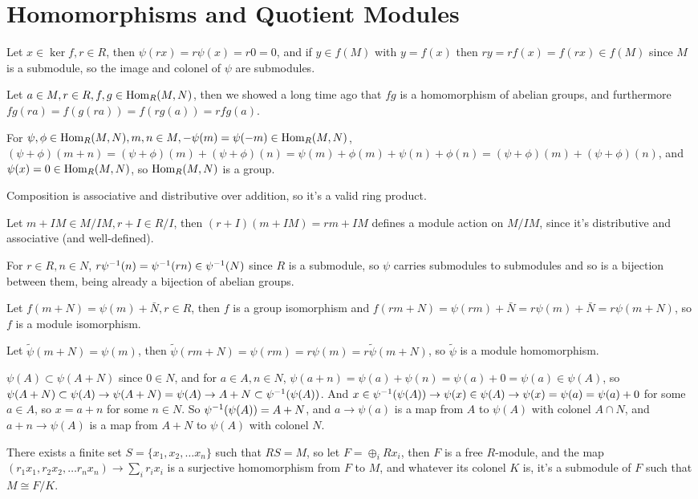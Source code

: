 \documentclass[11pt, oneside]{article}   	%
\begin{document}
\section{Homomorphisms and Quotient Modules}
\be
\item \be
\item Let $x \in \ker f, r \in R$, then $\psi(rx) = r\psi(x) = r0 = 0$, and if $y \in f(M)$ with $y = f(x)$ then $ry = rf(x) = f(rx) \in f(M)$ since $M$ is a submodule, so the image and colonel of $\psi$ are submodules.
\item Let $a \in M, r \in R, f, g \in \text{Hom}_R(M, N)$, then we showed a long time ago that $fg$ is a homomorphism of abelian groups, and furthermore $fg(ra) =f(g(ra)) = f(rg(a)) = rfg(a)$.
\ee
\item \be
\item For $\psi, \phi \in \text{Hom}_R(M, N), m, n \in M, -\psi(m) = \psi(-m) \in \text{Hom}_R(M, N)$, $(\psi + \phi)(m + n) = (\psi + \phi)(m) + (\psi + \phi)(n) = \psi(m) + \phi(m) + \psi(n) + \phi(n) = (\psi + \phi)(m) + (\psi + \phi)(n)$, and $\psi(x) = 0 \in \text{Hom}_R(M, N)$, so $\text{Hom}_R(M, N)$ is a group. 
\item Composition is associative and distributive over addition, so it's a valid ring product.
\ee
\item Let $m + IM \in M/IM, r + I \in R/I$, then $(r + I)(m + IM) = rm + IM$ defines a module action on $M/IM$, since it's distributive and associative (and well-defined). 
\item For $r \in R, n \in N$, $r\psi^{-1}(n) = \psi^{-1}(rn) \in \psi^{-1}(N)$ since $R$ is a submodule, so $\psi$ carries submodules to submodules and so is a bijection between them, being already a bijection of abelian groups.
\item Let $f(m + N) = \psi(m) + \bar{N}, r \in R$, then $f$ is a group isomorphism and $f(rm + N) = \psi(rm) + \bar{N} = r\psi(m) + \bar{N} = r\psi(m + N)$, so $f$ is a module isomorphism.
\item Let $\tilde{\psi}(m + N) = \psi(m)$, then $\tilde{\psi}(rm+N) = \psi(rm) = r\psi(m) = r\tilde{\psi}(m + N)$, so $\tilde{\psi}$ is a module homomorphism. 
\item $\psi(A) \subset \psi(A + N)$ since $0 \in N$, and for $a \in A, n \in N$, $\psi(a + n) = \psi(a) + \psi(n) = \psi(a) + 0 = \psi(a) \in \psi(A)$, so $\psi(A + N) \subset \psi(A) \rightarrow \psi(A + N) = \psi(A) \rightarrow A + N \subset \psi^{-1}(\psi(A))$. And $x \in \psi^{-1}(\psi(A)) \rightarrow \psi(x) \in \psi(A) \rightarrow \psi(x) = \psi(a) = \psi(a) + 0$ for some $a \in A$, so $x = a + n$ for some $n \in N$. So $\psi^{-1}(\psi(A)) = A + N$, and $a \to \psi(a)$ is a map from $A$ to $\psi(A)$ with colonel $A \cap N$, and $a + n \to \psi(A)$ is a map from $A + N$ to $\psi(A)$ with colonel $N$. 
\item There exists a finite set $S = \{x_1, x_2, \ldots x_n\}$ such that $RS = M$, so let $F = \oplus_i Rx_i$, then $F$ is a free $R$-module, and the map $(r_1x_1, r_2x_2, \ldots r_nx_n) \to \sum_i r_ix_i$ is a surjective homomorphism from $F$ to $M$, and whatever its colonel $K$ is, it's a submodule of $F$ such that $M \cong F / K$.
\ee
\end{document}
